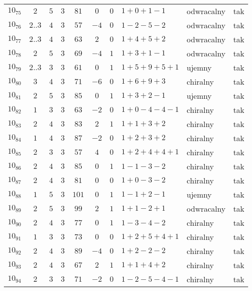 \begin{longtable}{lccccccllc}
$10_{75}$  & $2$   & $5$ & $3$ & $81$  & $0$  & $0$ & $1+0+1-1$     & odwracalny & tak \\
$10_{76}$  & $2..3$ & $4$ & $3$ & $57$  & $-4$ & $0$ & $1-2-5-2$     & odwracalny & tak \\
$10_{77}$  & $2..3$ & $4$ & $3$ & $63$  & $2$  & $0$ & $1+4+5+2$     & odwracalny & tak \\
$10_{78}$  & $2$   & $5$ & $3$ & $69$  & $-4$ & $1$ & $1+3+1-1$     & odwracalny & tak \\
$10_{79}$  & $2..3$ & $3$ & $3$ & $61$  & $0$  & $1$ & $1+5+9+5+1$   & ujemny     & tak \\
$10_{80}$  & $3$   & $4$ & $3$ & $71$  & $-6$ & $0$ & $1+6+9+3$     & chiralny   & tak \\
$10_{81}$  & $2$   & $5$ & $3$ & $85$  & $0$  & $1$ & $1+3+2-1$     & ujemny     & tak \\
$10_{82}$  & $1$   & $3$ & $3$ & $63$  & $-2$ & $0$ & $1+0-4-4-1$   & chiralny   & tak \\
$10_{83}$  & $2$   & $4$ & $3$ & $83$  & $2$  & $1$ & $1+1+3+2$     & chiralny   & tak \\
$10_{84}$  & $1$   & $4$ & $3$ & $87$  & $-2$ & $0$ & $1+2+3+2$     & chiralny   & tak \\
$10_{85}$  & $2$   & $3$ & $3$ & $57$  & $4$  & $0$ & $1+2+4+4+1$   & chiralny   & tak \\
$10_{86}$  & $2$   & $4$ & $3$ & $85$  & $0$  & $1$ & $1-1-3-2$     & chiralny   & tak \\
$10_{87}$  & $2$   & $4$ & $3$ & $81$  & $0$  & $0$ & $1+0-3-2$     & chiralny   & tak \\
$10_{88}$  & $1$   & $5$ & $3$ & $101$ & $0$  & $1$ & $1-1+2-1$     & ujemny     & tak \\
$10_{89}$  & $2$   & $5$ & $3$ & $99$  & $2$  & $1$ & $1+1-2+1$     & odwracalny & tak \\
$10_{90}$  & $2$   & $4$ & $3$ & $77$  & $0$  & $1$ & $1-3-4-2$     & chiralny   & tak \\
$10_{91}$  & $1$   & $3$ & $3$ & $73$  & $0$  & $0$ & $1+2+5+4+1$   & chiralny   & tak \\
$10_{92}$  & $2$   & $4$ & $3$ & $89$  & $-4$ & $0$ & $1+2-2-2$     & chiralny   & tak \\
$10_{93}$  & $2$   & $4$ & $3$ & $67$  & $2$  & $1$ & $1+1+4+2$     & chiralny   & tak \\
$10_{94}$  & $2$   & $3$ & $3$ & $71$  & $-2$ & $0$ & $1-2-5-4-1$   & chiralny   & tak \\

\end{longtable}
